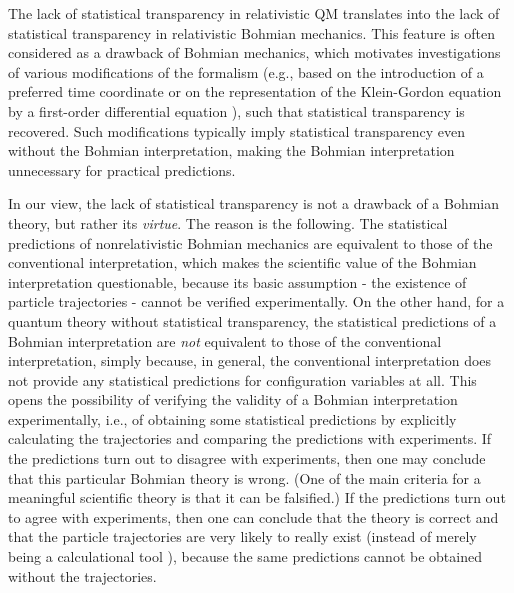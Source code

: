 \documentclass[12pt]{article}
\begin{document}
The lack of statistical transparency in relativistic QM
translates into the lack of statistical transparency in relativistic 
Bohmian mechanics. This feature is often considered as a drawback
of Bohmian mechanics, which motivates investigations of 
various modifications 
of the formalism (e.g., based on the introduction of a preferred 
time coordinate \cite{holpra} or on the representation of the 
Klein-Gordon equation by a first-order differential equation 
\cite{holNC}), 
such that statistical transparency is recovered.
Such modifications typically imply statistical transparency 
even without the Bohmian interpretation, making the Bohmian 
interpretation unnecessary for practical predictions.  

In our view, the lack of statistical transparency  
is not a drawback of a Bohmian theory, 
but rather its {\em virtue}. The reason is the following. 
The statistical predictions of nonrelativistic Bohmian 
mechanics are equivalent to those of the conventional 
interpretation, which makes the scientific value 
of the Bohmian interpretation questionable, because its basic 
assumption - the existence of particle trajectories - cannot 
be verified experimentally. On the other hand, for a quantum 
theory without statistical transparency, the statistical 
predictions of a Bohmian interpretation are {\em not} equivalent 
to those of the conventional interpretation, simply because,
in general,  
the conventional interpretation does not provide any 
statistical predictions for configuration variables at all. 
This opens the possibility
of verifying the validity of a Bohmian interpretation
experimentally,  
i.e., of obtaining some statistical predictions by explicitly 
calculating the trajectories and comparing the predictions with 
experiments. If the predictions turn out to disagree with experiments, 
then one may conclude that this particular Bohmian theory 
is wrong. (One of the main criteria for 
a meaningful scientific theory is that it can be falsified.) 
If the predictions turn out to agree 
with experiments, then one can conclude that the theory 
is correct and that the particle trajectories 
are very likely to really exist (instead of merely being a calculational 
tool \cite{lop}), 
because the same predictions cannot be obtained without 
the trajectories.
     
\end{document}
